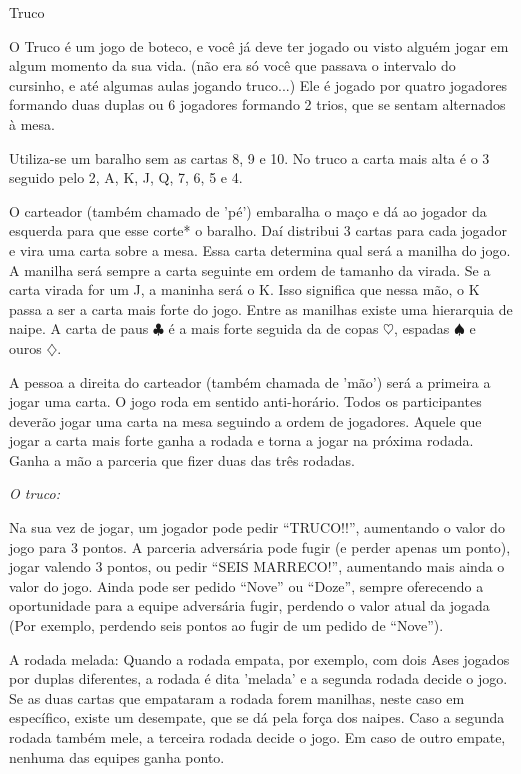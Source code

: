\begin{subsecao}{Truco}

O Truco é um jogo de boteco, e você já deve ter jogado ou visto alguém jogar em
algum momento da sua vida. (não era só você que passava o intervalo do
cursinho, e até algumas aulas jogando truco...) Ele é jogado por quatro
jogadores formando duas duplas ou 6 jogadores formando 2 trios, que se sentam
alternados à mesa.

Utiliza-se um baralho sem as cartas 8, 9 e 10. No truco a carta mais alta é o 3
seguido pelo 2, A, K, J, Q, 7, 6, 5 e 4. 

O carteador (também chamado de 'pé') embaralha o maço e dá ao jogador da
esquerda para que esse corte* o baralho. Daí distribui 3 cartas para cada
jogador e vira uma carta sobre a mesa. Essa carta determina qual será a manilha
do jogo. A manilha será sempre a carta seguinte em ordem de tamanho da virada.
Se a carta virada for um J, a maninha será o K. Isso significa que nessa mão, o
K passa a ser a carta mais forte do jogo. Entre as manilhas existe uma
hierarquia de naipe. A carta de paus $\clubsuit$  é a mais forte seguida da de copas $\heartsuit$,
espadas $\spadesuit$ e ouros $\diamondsuit$.

A pessoa a direita do carteador (também chamada de 'mão') será a primeira a
jogar uma carta. O jogo roda em sentido anti-horário. Todos os participantes
deverão jogar uma carta na mesa seguindo a ordem de jogadores. Aquele que jogar
a carta mais forte ganha a rodada e torna a jogar na próxima rodada. Ganha a
mão a parceria que fizer duas das três rodadas.

\textit{O truco:}

Na sua vez de jogar, um jogador pode pedir ``TRUCO!!'', aumentando o valor do
jogo para 3 pontos. A parceria adversária pode fugir (e perder apenas um
ponto), jogar valendo 3 pontos, ou pedir ``SEIS MARRECO!'', aumentando mais ainda
o valor do jogo. Ainda pode ser pedido ``Nove'' ou ``Doze'', sempre oferecendo a
oportunidade para a equipe adversária fugir, perdendo o valor atual da
jogada (Por exemplo, perdendo seis pontos ao fugir de um pedido de ``Nove''). 

A rodada melada: Quando a rodada empata, por exemplo, com dois Ases jogados por
duplas diferentes, a rodada é dita 'melada' e a segunda rodada decide o jogo.
Se as duas cartas que empataram a rodada forem manilhas, neste caso em
específico, existe um desempate, que se dá pela força dos naipes.  Caso a
segunda rodada também mele, a terceira rodada decide o jogo. Em caso de outro
empate, nenhuma das equipes ganha ponto. 


\end{subsecao}
